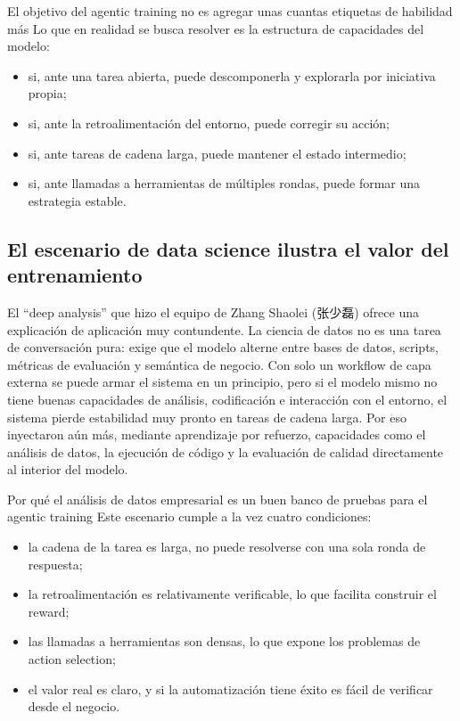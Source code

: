 \documentclass[a4paper]{article}
\begin{document}
\begin{importantbox}{El objetivo del agentic training no es agregar unas cuantas etiquetas de habilidad más}
Lo que en realidad se busca resolver es la estructura de capacidades del modelo:
\begin{itemize}
  \item si, ante una tarea abierta, puede descomponerla y explorarla por iniciativa propia;
  \item si, ante la retroalimentación del entorno, puede corregir su acción;
  \item si, ante tareas de cadena larga, puede mantener el estado intermedio;
  \item si, ante llamadas a herramientas de múltiples rondas, puede formar una estrategia estable.
\end{itemize}
\end{importantbox}

\subsection{El escenario de data science ilustra el valor del entrenamiento}

El ``deep analysis'' que hizo el equipo de Zhang Shaolei (张少磊) ofrece una explicación de aplicación muy contundente. La ciencia de datos no es una tarea de conversación pura: exige que el modelo alterne entre bases de datos, scripts, métricas de evaluación y semántica de negocio. Con solo un workflow de capa externa se puede armar el sistema en un principio, pero si el modelo mismo no tiene buenas capacidades de análisis, codificación e interacción con el entorno, el sistema pierde estabilidad muy pronto en tareas de cadena larga. Por eso inyectaron aún más, mediante aprendizaje por refuerzo, capacidades como el análisis de datos, la ejecución de código y la evaluación de calidad directamente al interior del modelo.

\begin{knowledgebox}{Por qué el análisis de datos empresarial es un buen banco de pruebas para el agentic training}
Este escenario cumple a la vez cuatro condiciones:
\begin{itemize}
  \item la cadena de la tarea es larga, no puede resolverse con una sola ronda de respuesta;
  \item la retroalimentación es relativamente verificable, lo que facilita construir el reward;
  \item las llamadas a herramientas son densas, lo que expone los problemas de action selection;
  \item el valor real es claro, y si la automatización tiene éxito es fácil de verificar desde el negocio.
\end{itemize}
\end{knowledgebox}
\end{document}
